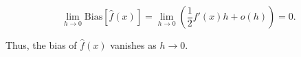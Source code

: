 \documentclass{article}
\newenvironment{colorparagraph}[1]{\par\color{#1}}{\par}
\begin{document}
\[
\lim_{h \to 0} \text{Bias}[\hat{f}(x)] = \lim_{h \to 0} \left( \frac{1}{2} f'(x) h + o(h) \right) = 0.
\]

Thus, the bias of \( \hat{f}(x) \) vanishes as \( h \to 0 \).





\end{document}
